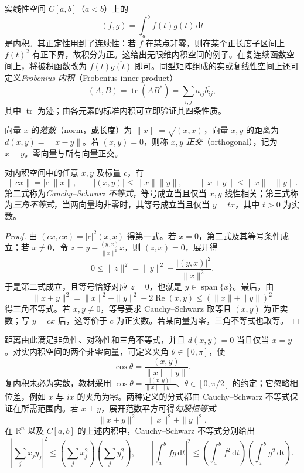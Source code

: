 \begin{example}
实线性空间 $C[a,b]$（$a<b$）上的
\[
    (f,g)=\int_a^b f(t)g(t)\,\mathrm dt
\]
是内积。其正定性用到了连续性：若 $f$ 在某点非零，则在某个正长度子区间上 $f(t)^2$ 有正下界，故积分为正。这给出无限维内积空间的例子。在复连续函数空间上，将被积函数改为 $f(t)\overline{g(t)}$ 即可。同型矩阵组成的实或复线性空间上还可定义\emph{Frobenius 内积}（Frobenius inner product）
\[
    (A,B)=\operatorname{tr}(AB^*)
    =\sum_{i,j}a_{ij}\overline{b_{ij}},
\]
其中 $\operatorname{tr}$ 为迹；由各元素的标准内积可立即验证其四条性质。
\end{example}

\begin{definition}
向量 $x$ 的\emph{范数}（norm，或长度）为 $\|x\|=\sqrt{(x,x)}$，向量 $x,y$ 的距离为 $d(x,y)=\|x-y\|$。若 $(x,y)=0$，则称 $x,y$ \emph{正交}（orthogonal），记为 $x\perp y$。零向量与所有向量正交。
\end{definition}

\begin{theorem}
\label{thm:inner-product-inequalities}
对内积空间中的任意 $x,y$ 及标量 $c$，有
\[
    \|cx\|=|c|\|x\|,\qquad
    |(x,y)|\leq\|x\|\|y\|,\qquad
    \|x+y\|\leq\|x\|+\|y\|.
\]
第二式称为\emph{Cauchy--Schwarz 不等式}，等号成立当且仅当 $x,y$ 线性相关；第三式称为\emph{三角不等式}，当两向量均非零时，其等号成立当且仅当 $y=tx$，其中 $t>0$ 为实数。
\end{theorem}

\begin{proof}
由 $(cx,cx)=|c|^2(x,x)$ 得第一式。若 $x=0$，第二式及其等号条件成立；若 $x\ne0$，令 $z=y-\frac{(y,x)}{\|x\|^2}x$，则 $(z,x)=0$，展开得
\[
    0\leq\|z\|^2=\|y\|^2-\frac{|(y,x)|^2}{\|x\|^2}.
\]
于是第二式成立，且等号恰好对应 $z=0$，也就是 $y\in\operatorname{span}\{x\}$。最后，由
\[
    \|x+y\|^2=\|x\|^2+\|y\|^2+2\operatorname{Re}(x,y)
    \leq(\|x\|+\|y\|)^2
\]
得三角不等式。若 $x,y\ne0$，等号要求 Cauchy--Schwarz 取等且 $(x,y)$ 为正实数；写 $y=cx$ 后，这等价于 $c$ 为正实数。若某向量为零，三角不等式也取等。
\end{proof}

距离由此满足非负性、对称性和三角不等式，并且 $d(x,y)=0$ 当且仅当 $x=y$。对实内积空间的两个非零向量，可定义夹角 $\theta\in[0,\pi]$，使
\[
    \cos\theta=\frac{(x,y)}{\|x\|\|y\|}.
\]
复内积未必为实数，教材采用 $\cos\theta=\frac{|(x,y)|}{\|x\|\|y\|}$、$\theta\in[0,\pi/2]$ 的约定；它忽略相位差，例如 $x$ 与 $ix$ 的夹角为零。两种定义的分式都由 Cauchy--Schwarz 不等式保证在所需范围内。若 $x\perp y$，展开范数平方可得\emph{勾股恒等式}
\begin{equation}
\label{eq:inner-product-pythagoras}
    \|x+y\|^2=\|x\|^2+\|y\|^2.
\end{equation}
在 $\mathbb R^n$ 以及 $C[a,b]$ 的上述内积中，Cauchy--Schwarz 不等式分别给出
\[
    \left|\sum_j x_jy_j\right|^2\leq
    \left(\sum_j x_j^2\right)\left(\sum_j y_j^2\right),\qquad
    \left|\int_a^b fg\,\mathrm dt\right|^2\leq
    \left(\int_a^b f^2\,\mathrm dt\right)
    \left(\int_a^b g^2\,\mathrm dt\right).
\]

